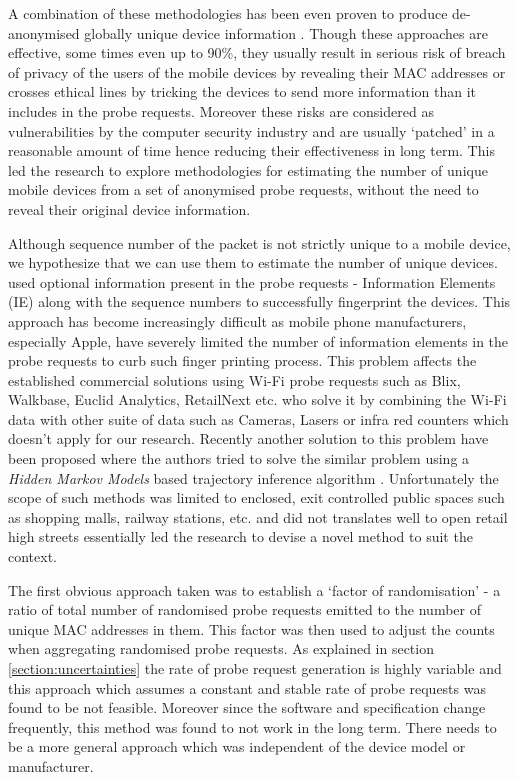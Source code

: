A combination of these methodologies has been even proven to produce de-anonymised globally unique device information \cite[-4cm]{vanhoef2016, martin2017}. 
Though these approaches are effective, some times even up to 90\%, they usually result in serious risk of breach of privacy of the users of the mobile devices by revealing their MAC addresses or crosses ethical lines by tricking the devices to send more information than it includes in the probe requests.
Moreover these risks are considered as vulnerabilities by the computer security industry and are usually `patched' in a reasonable amount of time hence reducing their effectiveness in long term.
This led the research to explore methodologies for estimating the number of unique mobile devices from a set of anonymised probe requests, without the need to reveal their original device information.

Although sequence number of the packet is not strictly unique to a mobile device, we hypothesize that we can use them to estimate the number of unique devices.
\citet{vanhoef2016} used optional information present in the probe requests - Information Elements (IE) along with the sequence numbers to successfully fingerprint the devices.
This approach has become increasingly difficult as mobile phone manufacturers, especially Apple, have severely limited the number of information elements in the probe requests to curb such finger printing process.
This problem affects the established commercial solutions using Wi-Fi probe requests such as Blix, Walkbase, Euclid Analytics, RetailNext etc. who solve it by combining the Wi-Fi data with other suite of data such as Cameras, Lasers or infra red counters which doesn't apply for our research.
Recently another solution to this problem have been proposed where the authors tried to solve the similar problem using a \textit{Hidden Markov Models} based trajectory inference algorithm \cite{hong2018}.
Unfortunately the scope of such methods was limited to enclosed, exit controlled public spaces such as shopping malls, railway stations, etc. and did not translates well to open retail high streets essentially led the research to devise a novel method to suit the context.

The first obvious approach taken was to establish a `factor of randomisation' - a ratio of total number of randomised probe requests emitted to the number of unique MAC addresses in them.
This factor was then used to adjust the counts when aggregating randomised probe requests.
As explained in section \ref{section:uncertainties} the rate of probe request generation is highly variable and this approach which assumes a constant and stable rate of probe requests was found to be not feasible.
Moreover since the software and specification change frequently, this method was found to not work in the long term.
There needs to be a more general approach which was independent of the device model or manufacturer.

